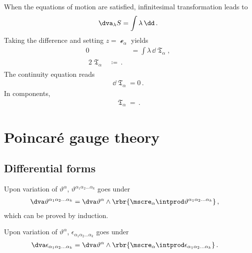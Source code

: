 \documentclass[a4paper]{article}
\begin{document}
When the equations of motion are satisfied, infinitesimal 
transformation leads to
\begin{align}
\dva_{\lambda} S = \int \lambda\,\dd \,.
\end{align}
Taking the difference and setting $z = \mscre_{\alpha}$ yields
\begin{align}
0 &= \int \lambda\,\dd \mfrakT_{\alpha}, \\
\begin{split}
2 \mfrakT_{\alpha} &\coloneqq \,.
\end{split}
\end{align}
The continuity equation reads
\begin{align}
\dd \mfrakT_{\alpha} = 0\,.
\end{align}
In components,
\begin{align}
\mfrakT_{\alpha} = \,.
\end{align}


\section{Poincaré gauge theory}


\subsection{Differential forms}



Upon variation of $\vartheta^{\alpha}$, $\vartheta^{\alpha_{1}\alpha_{2}\ldots 
\alpha_{k}}$ goes under
\begin{align}
\dva \vartheta^{\alpha_{1}\alpha_{2}\ldots \alpha_{k}} &=
\dva \vartheta^{\alpha} \wedge \rbr{\mscre_{\alpha}\intprod 
	\vartheta^{\alpha_{1}\alpha_{2}\ldots \alpha_{k}}}\,,
\end{align}
which can be proved by induction.

Upon variation of $\vartheta^{\alpha}$, $\epsilon_{\alpha_{1}\alpha_{2}\ldots 
\alpha_{k}}$ goes under \cite[sec.\ A.2]{Muench1998}
\begin{align}
\dva \epsilon_{\alpha_{1}\alpha_{2}\ldots \alpha_{k}} &=
\dva \vartheta^{\alpha} \wedge \rbr{\mscre_{\alpha}\intprod 
	\epsilon_{\alpha_{1}\alpha_{2}\ldots \alpha_{k}}}\,.
\end{align}
\end{document}
